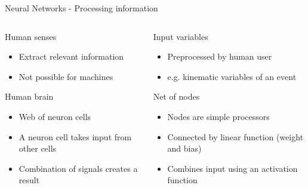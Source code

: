\begin{frame}{Neural Networks - Processing information}
\begin{columns}
\quad
    \begin{column}{0.45\textwidth}
    \begin{block}{Human senses}
    \begin{itemize}
        \item Extract relevant information
        \item Not possible for machines
    \end{itemize}
    \end{block}
    \begin{block}{Human brain}
        \begin{itemize}
            \item Web of neuron cells
            \item A neuron cell takes input from other cells
            \item Combination of signals creates a result
        \end{itemize}
    \end{block}
    \end{column}
    \quad
    \begin{column}{0.45\textwidth}
    \begin{block}{Input variables}
    \begin{itemize}
        \item Preprocessed by human user
        \item {e.g.} kinematic variables of an event
    \end{itemize}
    \end{block}
    \begin{block}{Net of nodes}
    \begin{itemize}
        \item Nodes are simple processors
        \item Connected by linear function (weight and bias)
        \item Combines input using an activation function
    \end{itemize}
    \end{block}
    \end{column}
\quad
\end{columns}
\end{frame}

